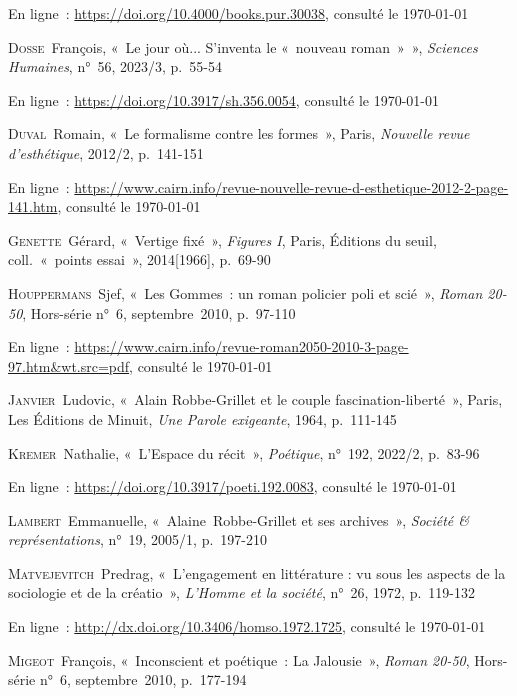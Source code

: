 \documentclass[12pt, a4paper]{article}
\begin{document}
            En ligne~: \hyperlink{https://doi.org/10.4000/books.pur.30038}{https://doi.org/10.4000/books.pur.30038}, consulté le \today
        \par
    \textsc{Dosse}~François, «~Le jour où... S'inventa le «~nouveau roman~»~»,  \textit{Sciences Humaines}, n°~56, 2023/3, p.~55-54
            
            En ligne~: \hyperlink{https://doi.org/10.3917/sh.356.0054}{https://doi.org/10.3917/sh.356.0054}, consulté le \today
        \par
    \textsc{Duval}~Romain, «~Le formalisme contre les formes~», Paris, \textit{Nouvelle revue d’esthétique}, 2012/2, p.~141-151
            
            En ligne~: \hyperlink{https://www.cairn.info/revue-nouvelle-revue-d-esthetique-2012-2-page-141.htm}{https://www.cairn.info/revue-nouvelle-revue-d-esthetique-2012-2-page-141.htm}, consulté le \today
        \par
    \textsc{Genette}~Gérard, «~Vertige fixé~», \textit{Figures I}, Paris, Éditions du seuil, coll.~«~points essai~», 2014[1966], p.~69-90\par
    \textsc{Houppermans}~Sjef, «~Les Gommes~: un roman policier poli et scié~»,  \textit{Roman 20-50}, Hors-série n°~6, septembre~2010, p.~97-110
            
            En ligne~: \hyperlink{https://www.cairn.info/revue-roman2050-2010-3-page-97.htm\&wt.src=pdf}{https://www.cairn.info/revue-roman2050-2010-3-page-97.htm\&wt.src=pdf}, consulté le \today
        \par
    \textsc{Janvier}~Ludovic, «~Alain Robbe-Grillet et le couple fascination-liberté~», Paris, Les Éditions de Minuit, \textit{Une Parole exigeante}, 1964, p.~111-145\par
    \textsc{Kremer}~Nathalie, «~L'Espace du récit~»,  \textit{Poétique}, n°~192, 2022/2, p.~83-96
            
            En ligne~: \hyperlink{https://doi.org/10.3917/poeti.192.0083}{https://doi.org/10.3917/poeti.192.0083}, consulté le \today
        \par
    \textsc{Lambert}~Emmanuelle, «~Alaine~Robbe-Grillet et ses archives~»,  \textit{Société \& représentations}, n°~19, 2005/1, p.~197-210\par
    \textsc{Matvejevitch}~Predrag, «~L'engagement en littérature : vu sous les aspects de la sociologie et de la créatio~»,  \textit{L'Homme et la société}, n°~26, 1972, p.~119-132
            
            En ligne~: \hyperlink{http://dx.doi.org/10.3406/homso.1972.1725}{http://dx.doi.org/10.3406/homso.1972.1725}, consulté le \today
        \par
    \textsc{Migeot}~François, «~Inconscient et poétique~: La Jalousie~»,  \textit{Roman 20-50}, Hors-série n°~6, septembre~2010, p.~177-194
            
\end{document}
